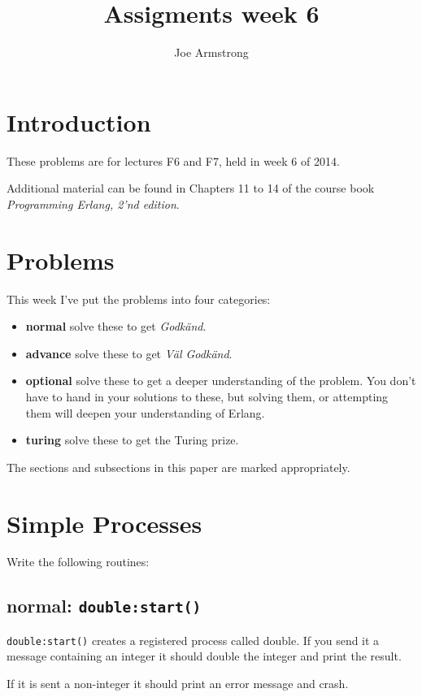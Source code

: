 \documentclass[12pt]{hitec}
\title{Assigments week 6}
\author{Joe Armstrong}
\begin{document}
\maketitle

\tableofcontents

\section{Introduction}
These problems are for lectures F6 and F7, held in week 6 of 2014.

Additional material can be found in Chapters 11 to 14 of the course book
{\sl Programming Erlang, 2'nd edition}.

\section{Problems}

This week I've put the problems into four categories:

\begin{itemize}
\item {\bf normal} solve these to get {\sl Godk\"{a}nd}.
\item {\bf advance} solve these to get {\sl V\"{a}l Godk\"{a}nd}.
\item {\bf optional} solve these to get a deeper understanding of the problem. You don't
have to hand in your solutions to these, but solving them, or attempting them will
deepen your understanding of Erlang.
\item {\bf turing} solve these to get the Turing prize.
\end{itemize}

The sections and subsections in this paper are marked appropriately.

\section{Simple Processes}


Write the following routines:

\subsection{normal: \texttt{double:start()}}

\verb+double:start()+ creates a registered process called double.
If you send it a message containing an integer it should
double the integer and print the result.

If it is sent a non-integer it should print an error message
and crash.
\end{document}
